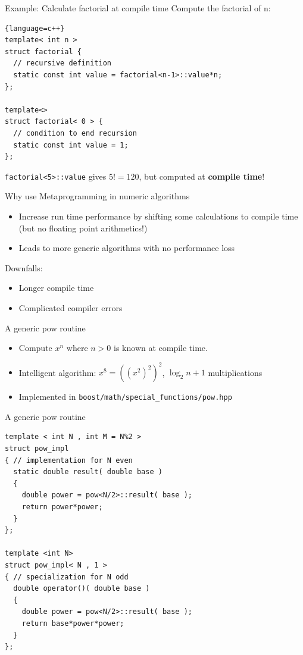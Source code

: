 \documentclass{beamer}
\begin{document}
\begin{frame}[fragile]{Example: Calculate factorial at compile time}
Compute the factorial of n:

\begin{lstlisting}{language=c++}
template< int n >
struct factorial {
  // recursive definition
  static const int value = factorial<n-1>::value*n;
};

template<>
struct factorial< 0 > {
  // condition to end recursion
  static const int value = 1;
};
\end{lstlisting}

\lstinline+factorial<5>::value+ gives $5!=120$, but computed at \textbf{compile time}!
\end{frame}

\begin{frame}{Why use Metaprogramming in numeric algorithms}
	
	\begin{itemize}
    \item Increase run time performance by shifting some calculations to compile time (but no floating point arithmetics!)
    \item Leads to more generic algorithms with no performance loss
	\end{itemize}
\pause
\vspace{1em}
\begin{Large}Downfalls:\end{Large}
\begin{itemize}
 \item Longer compile time
 \item Complicated compiler errors
\end{itemize}

\end{frame}


\begin{frame}[fragile]{A generic pow routine}
\begin{itemize}
 \item Compute $x^n$ where $n>0$ is known at compile time.
 \item Intelligent algorithm: $x^8 = ((x^2)^2)^2$, $\log_2 n + 1$ multiplications
 \item Implemented in \lstinline+boost/math/special_functions/pow.hpp+
\end{itemize}
\end{frame}

\begin{frame}[fragile]{A generic pow routine}
\begin{lstlisting}
template < int N , int M = N%2 >
struct pow_impl
{ // implementation for N even
  static double result( double base )
  { 
    double power = pow<N/2>::result( base );
    return power*power;
  }
};

template <int N>
struct pow_impl< N , 1 >
{ // specialization for N odd
  double operator()( double base )
  { 
    double power = pow<N/2>::result( base );
    return base*power*power;
  }
};
\end{lstlisting}
 
\end{frame}
\end{document}
